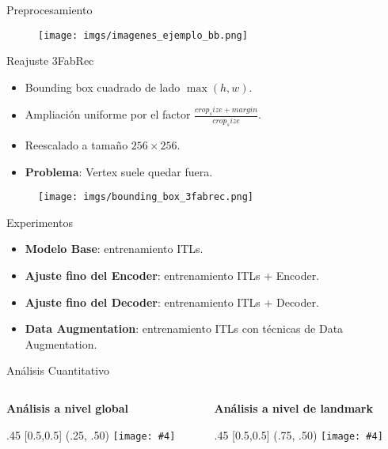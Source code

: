 \documentclass[aspectratio=43]{beamer}
\newcommand{\absimage}[4][0.5,0.5]{%
	\begin{textblock}{#3}%
		[#1]%
		(#2)%
		\texttt{[image: \#4]}%
\end{textblock}}
\begin{document}
\begin{frame}{Preprocesamiento}
  \begin{figure}
    \centering
    \texttt{[image: imgs/imagenes\_ejemplo\_bb.png]}
  \end{figure}
\end{frame}

\begin{frame}{Reajuste 3FabRec}
  \begin{itemize}
      \item Bounding box cuadrado de lado $\max(h,w)$.
      \item Ampliación uniforme por el factor $\frac{crop_size+margin}{crop_size}$.
      \item Reescalado a tamaño $256 \times 256$.
      \item \textbf{Problema}: Vertex suele quedar fuera.
  \end{itemize}
  \begin{figure}
    \centering
    \texttt{[image: imgs/bounding\_box\_3fabrec.png]}
  \end{figure}
\end{frame}

\begin{frame}{Experimentos}
  \begin{itemize}
    \item \textbf{Modelo Base}: entrenamiento ITLs.
    \item \textbf{Ajuste fino del Encoder}: entrenamiento ITLs + Encoder.
    \item \textbf{Ajuste fino del Decoder}: entrenamiento ITLs + Decoder.
    \item \textbf{Data Augmentation}: entrenamiento ITLs con técnicas de Data Augmentation.
  \end{itemize}
\end{frame}

\begin{frame}{Análisis Cuantitativo}
  \begin{columns}[onlytextwidth]
    \begin{column}{.5\textwidth}
      \centering \textcolor{tudCyan}{\textbf{Análisis a nivel global}}
      \absimage{.25, .50}{.45}{imgs/boxplot_sumarize.png}
    \end{column}
    \begin{column}{.5\textwidth}
      \centering \textcolor{tudCyan}{\textbf{Análisis a nivel de landmark}}
      \absimage{.75, .50}{.45}{imgs/tabla_landmarks.png}
    \end{column}
  \end{columns}
\end{frame}
\end{document}
